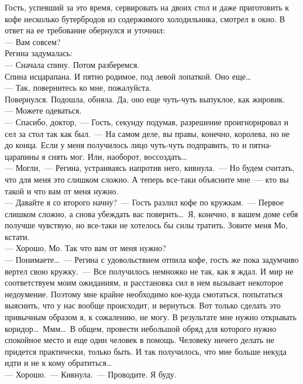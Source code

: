 Гость, успевший за это время, сервировать на двоих стол и даже приготовить к 
кофе несколько бутербродов из содержимого холодильника, смотрел в окно. В ответ 
на ее требование обернулся и уточнил:\\
--- Вам совсем?\\
Регина задумалась:\\
--- Сначала спину. Потом разберемся.\\
Спина исцарапана. И пятно родимое, под левой лопаткой. Оно еще\ldots\\
--- Так, повернитесь ко мне, пожалуйста.\\
Повернулся. Подошла, обняла. Да, оно еще чуть-чуть выпуклое, как жировик.\\
--- Можете одеваться.\\
--- Спасибо, доктор,~--- Гость, секунду подумав, разрешение проигнорировал и 
сел за 
стол так как был.~--- На самом деле, вы правы, конечно, королева, но не до 
конца. 
Если у меня получилось лицо чуть-чуть подправить, то и пятна-царапины я снять 
мог. Или, наоборот, воссоздать\ldots\\
--- Могли,~--- Регина, устраиваясь напротив него, кивнула.~--- Но будем 
считать, что 
для меня это слишком сложно. А теперь все-таки объясните мне~--- кто вы такой и 
что вам от меня нужно.\\
--- Давайте я со второго начну?~--- Гость разлил кофе по кружкам.~--- Первое 
слишком 
сложно, а снова убеждать вас поверить\ldots\ Я, конечно, в вашем доме себя 
получше 
чувствую, но все-таки не хотелось бы силы тратить. Зовите меня Мо, кстати.\\
--- Хорошо, Мо. Так что вам от меня нужно?\\
--- Понимаете\ldots~--- Регина с удовольствием отпила кофе, гость же пока 
задумчиво 
вертел свою кружку.~--- Все получилось немножко не так, как я ждал. И мир не 
соответствуем моим ожиданиям, и расстановка сил в нем вызывает некоторое 
недоумение. Поэтому мне крайне необходимо кое-куда смотаться, попытаться 
выяснить, что у нас вообще происходит, и вернуться. Вот только сделать это 
привычным образом я, к сожалению, не могу. В результате мне нужно открывать 
коридор\ldots\ Ммм\ldots\ В общем, провести небольшой обряд для которого нужно 
спокойное 
место и еще один человек в помощь. Человеку ничего делать не придется 
практически, только быть. И так получилось, что мне больше некуда идти и не к 
кому обратиться\ldots\\
--- Хорошо.~--- Кивнула.~--- Проводите. Я буду.\\
